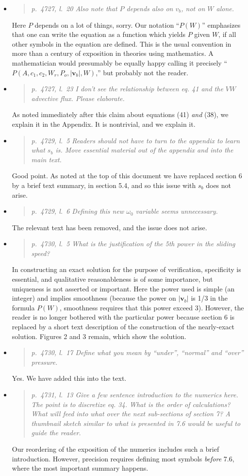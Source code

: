 \documentclass[11pt,reqno]{amsart}
\newcommand{\reply}[2]{
\medskip\medskip
\item  \begin{quote}
\emph{#1}
\end{quote}

\medskip
\noindent #2}
\begin{document}
\begin{itemize}
\reply{p.~4727, l.~20 Also note that $P$ depends also on $v_b$, not on $W$ alone.}
{Here $P$ depends on a lot of things, sorry.  Our notation ``$P(W)$'' emphasizes that one can write the equation as a function which yields $P$ given $W$, if all other symbols in the equation are defined.  This is the usual convention in more than a century of exposition in theories using mathematics.  A mathematician would presumably be equally happy calling it precisely ``$P(A,c_1,c_2,W_r,P_o,|\mathbf{v}_b|,W)$,'' but probably not the reader.}

\reply{p.~4727, l.~23 I don’t see the relationship between eq. 41 and the $VW$ advective flux.  Please elaborate.}
{As noted immediately after this claim about equations (41) \emph{and} (38), we explain it in the Appendix.  It is nontrivial, and we explain it.}

\reply{p.~4729, l.~5 Readers should not have to turn to the appendix to learn what $s_b$ is. Move essential material out of the appendix and into the main text.}
{Good point.  As noted at the top of this document we have replaced section 6 by a brief text summary, in section 5.4, and so this issue with $s_b$ does not arise.}

\reply{p.~4729, l.~6 Defining this new $\omega_0$ variable seems unnecessary.}
{The relevant text has been removed, and the issue does not arise.}

\reply{p.~4730, l.~5 What is the justification of the 5th power in the sliding speed?}
{In constructing an exact solution for the purpose of verification, specificity is essential, and qualitative reasonableness is of some importance, but uniqueness is not asserted or important.  Here the power used is simple (an integer) and implies smoothness (because the power on $|\mathbf{v}_b|$ is 1/3 in the formula $P(W)$, smoothness requires that this power exceed 3).  However, the reader is no longer bothered with the particular power because section 6 is replaced by a short text description of the construction of the nearly-exact solution.  Figures 2 and 3 remain, which show the solution.}

\reply{p.~4730, l.~17 Define what you mean by ``under'', ``normal'' and ``over'' pressure.}
{Yes.  We have added this into the text.}

\reply{p.~4731, l.~13 Give a few sentence introduction to the numerics here. The point is to
discretize eq. 34. What is the order of calculations? What will feed into what over the
next sub-sections of section 7? A thumbnail sketch similar to what is presented in 7.6
would be useful to guide the reader.}
{Our reordering of the exposition of the numerics includes such a brief introduction.  However, precision requires defining most symbols \emph{before} 7.6, where the most important summary happens.}


\end{itemize}
\end{document}
